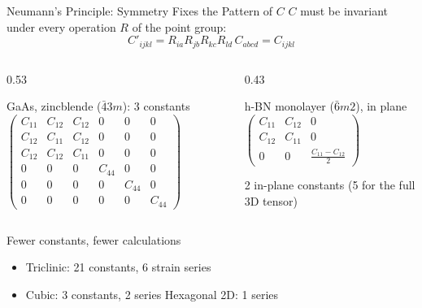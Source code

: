 \documentclass[8pt]{beamer}
\begin{document}
\begin{frame}{Neumann's Principle: Symmetry Fixes the Pattern of $C$}
	\centering
	$C$ must be invariant under every operation $R$ of the point group:
	\[
		C'_{ijkl} = R_{ia}R_{jb}R_{kc}R_{ld}\,C_{abcd} = C_{ijkl}
	\]
	\begin{columns}[T]
		\begin{column}{0.53\textwidth}
			\begin{block}{GaAs, zincblende ($\bar{4}3m$): 3 constants}
				\centering\small
				$\begin{pmatrix}
					C_{11} & C_{12} & C_{12} & 0 & 0 & 0 \\
					C_{12} & C_{11} & C_{12} & 0 & 0 & 0 \\
					C_{12} & C_{12} & C_{11} & 0 & 0 & 0 \\
					0 & 0 & 0 & C_{44} & 0 & 0 \\
					0 & 0 & 0 & 0 & C_{44} & 0 \\
					0 & 0 & 0 & 0 & 0 & C_{44}
				\end{pmatrix}$
			\end{block}
		\end{column}
		\begin{column}{0.43\textwidth}
			\begin{block}{h-BN monolayer ($\bar{6}m2$), in plane}
				\centering\small
				$\begin{pmatrix}
					C_{11} & C_{12} & 0 \\
					C_{12} & C_{11} & 0 \\
					0 & 0 & \tfrac{C_{11}-C_{12}}{2}
				\end{pmatrix}$
				\par\vspace{0.15cm}
				{\scriptsize 2 in-plane constants (5 for the full 3D tensor)}
			\end{block}
		\end{column}
	\end{columns}
	\vspace{0.2cm}
	\begin{alertblock}{Fewer constants, fewer calculations}
		\small
		\begin{itemize}
			\item Triclinic: 21 constants, 6 strain series
			\item Cubic: 3 constants, 2 series \quad Hexagonal 2D: 1 series
		\end{itemize}
	\end{alertblock}
\end{frame}
\end{document}

